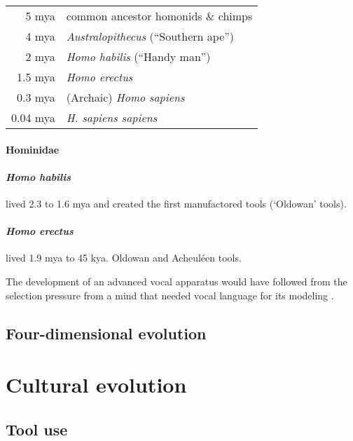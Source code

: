 \documentclass{article}
\begin{document}
\begin{tabular}{rl}
5 mya & common ancestor homonids \& chimps \\
4 mya & \textit{Australopithecus} (“Southern ape”) \\
2 mya & \textit{Homo habilis} (“Handy man”) \\
1.5 mya & \textit{Homo erectus} \\
0.3 mya & (Archaic) \textit{Homo sapiens} \\
0.04 mya & \textit{H. sapiens sapiens} \\
\end{tabular}

\paragraph{Hominidae}

\paragraph{\textit{Homo habilis}} lived 2.3 to 1.6 mya and created the first manufactored tools (`Oldowan' tools).

\paragraph{\textit{Homo erectus}} lived 1.9 mya to 45 kya.
Oldowan and Acheuléen tools.

The development of an advanced vocal apparatus would have followed from the selection pressure from a mind that needed vocal language for its modeling \citep[p.220]{donald1991}.

\subsection{Four-dimensional evolution}

\citet{jablonka2007}


\section{Cultural evolution}
\label{sec:cultural_evolution}

\subsection{Tool use}
\label{sec:tool-use}







\makeindex
\end{document}
